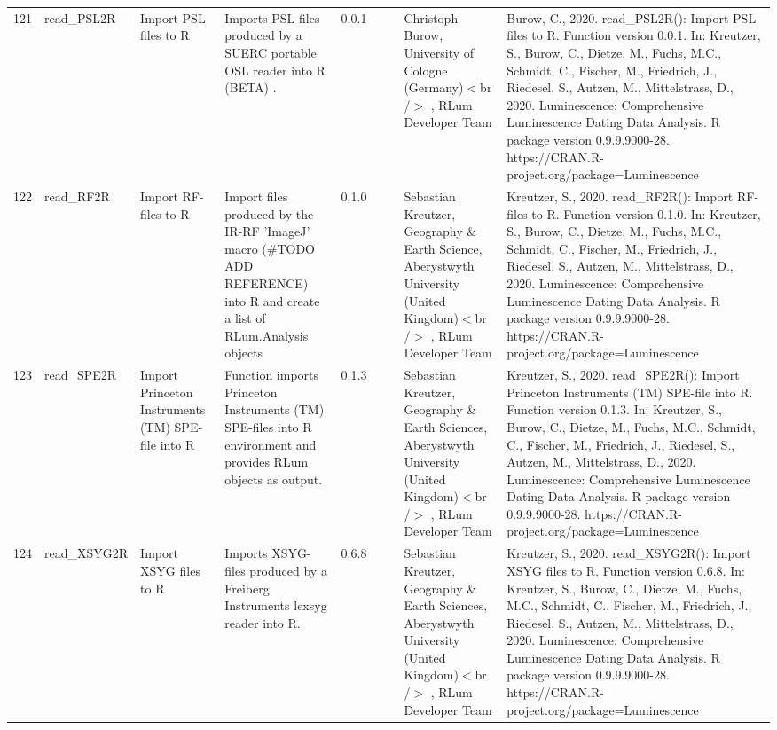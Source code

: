 \begin{table}[ht]
\begin{tabular}{rllllllll}
 \\ 
  121 & read\_PSL2R & Import PSL files to R & Imports PSL files produced by a SUERC portable OSL reader into R  (BETA) . & 0.0.1
 &  &  & Christoph Burow, University of Cologne (Germany)$<$br /$>$ , RLum Developer Team & Burow, C., 2020. read\_PSL2R(): Import PSL files to R. Function version 0.0.1. In: Kreutzer, S., Burow, C., Dietze, M., Fuchs, M.C., Schmidt, C., Fischer, M., Friedrich, J., Riedesel, S., Autzen, M., Mittelstrass, D., 2020. Luminescence: Comprehensive Luminescence Dating Data Analysis. R package version 0.9.9.9000-28. https://CRAN.R-project.org/package=Luminescence
 \\ 
  122 & read\_RF2R & Import RF-files to R & Import files produced by the IR-RF 'ImageJ' macro (\#TODO ADD REFERENCE) into R and create a list of  RLum.Analysis  objects & 0.1.0
 &  &  & Sebastian Kreutzer, Geography \& Earth Science, Aberystwyth University (United Kingdom)$<$br /$>$ , RLum Developer Team & Kreutzer, S., 2020. read\_RF2R(): Import RF-files to R. Function version 0.1.0. In: Kreutzer, S., Burow, C., Dietze, M., Fuchs, M.C., Schmidt, C., Fischer, M., Friedrich, J., Riedesel, S., Autzen, M., Mittelstrass, D., 2020. Luminescence: Comprehensive Luminescence Dating Data Analysis. R package version 0.9.9.9000-28. https://CRAN.R-project.org/package=Luminescence
 \\ 
  123 & read\_SPE2R & Import Princeton Instruments (TM) SPE-file into R & Function imports Princeton Instruments (TM) SPE-files into R environment and provides  RLum  objects as output. & 0.1.3
 &  &  & Sebastian Kreutzer, Geography \& Earth Sciences, Aberystwyth University (United Kingdom)$<$br /$>$ , RLum Developer Team & Kreutzer, S., 2020. read\_SPE2R(): Import Princeton Instruments (TM) SPE-file into R. Function version 0.1.3. In: Kreutzer, S., Burow, C., Dietze, M., Fuchs, M.C., Schmidt, C., Fischer, M., Friedrich, J., Riedesel, S., Autzen, M., Mittelstrass, D., 2020. Luminescence: Comprehensive Luminescence Dating Data Analysis. R package version 0.9.9.9000-28. https://CRAN.R-project.org/package=Luminescence
 \\ 
  124 & read\_XSYG2R & Import XSYG files to R & Imports XSYG-files produced by a Freiberg Instruments lexsyg reader into R. & 0.6.8
 &  &  & Sebastian Kreutzer, Geography \& Earth Sciences, Aberystwyth University (United Kingdom)$<$br /$>$ , RLum Developer Team & Kreutzer, S., 2020. read\_XSYG2R(): Import XSYG files to R. Function version 0.6.8. In: Kreutzer, S., Burow, C., Dietze, M., Fuchs, M.C., Schmidt, C., Fischer, M., Friedrich, J., Riedesel, S., Autzen, M., Mittelstrass, D., 2020. Luminescence: Comprehensive Luminescence Dating Data Analysis. R package version 0.9.9.9000-28. https://CRAN.R-project.org/package=Luminescence

\end{tabular}
\end{table}
